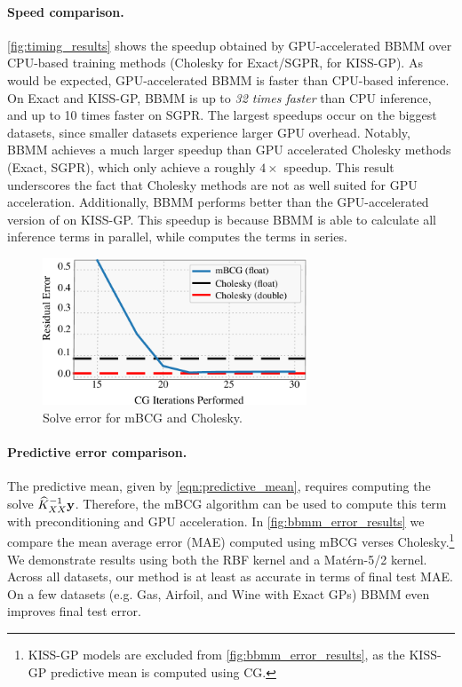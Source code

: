 \paragraph{Speed comparison.}
\cref{fig:timing_results} shows the speedup obtained by GPU-accelerated BBMM over CPU-based training methods (Cholesky for Exact/SGPR, \citet{dong2017scalable} for KISS-GP).
As would be expected, GPU-accelerated BBMM is faster than CPU-based inference.
On Exact and KISS-GP, BBMM is up to \emph{32 times faster} than CPU inference, and up to 10 times faster on SGPR.
The largest speedups occur on the biggest datasets, since smaller datasets experience larger GPU overhead.
Notably, BBMM achieves a much larger speedup than GPU accelerated Cholesky methods (Exact, SGPR), which only achieve a roughly $4\times$ speedup.
This result underscores the fact that Cholesky methods are not as well suited for GPU acceleration.
Additionally, BBMM performs better than the GPU-accelerated version of \cite{dong2017scalable} on KISS-GP.
This speedup is because BBMM is able to calculate all inference terms in parallel, while \cite{dong2017scalable} computes the terms in series.

\begin{figure}[t!]
  \begin{center}
    \includegraphics[width=0.70\textwidth]{figures/cg_error}
  \end{center}
  \caption{Solve error for mBCG and Cholesky. \label{fig:cg_error}}
\end{figure}

\paragraph{Predictive error comparison.}
The predictive mean, given by \cref{eqn:predictive_mean}, requires computing the solve $\widehat{K}_{XX}^{-1} \mathbf{y}$.
Therefore, the mBCG algorithm can be used to compute this term with preconditioning and GPU acceleration.
In \cref{fig:bbmm_error_results} we compare the mean average error (MAE) computed using mBCG verses Cholesky.\footnote{
  KISS-GP models are excluded from \cref{fig:bbmm_error_results}, as the KISS-GP predictive mean is computed using CG.
}
We demonstrate results using both the RBF kernel and a Mat\'ern-5/2 kernel.
Across all datasets, our method is at least as accurate in terms of final test MAE.
On a few datasets (e.g. Gas, Airfoil, and Wine with Exact GPs) BBMM even improves final test error.

